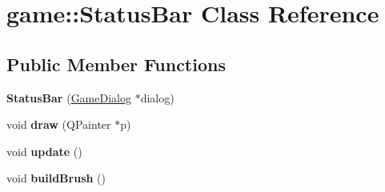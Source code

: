 \hypertarget{classgame_1_1StatusBar}{}\section{game\+:\+:Status\+Bar Class Reference}
\label{classgame_1_1StatusBar}
\subsection*{Public Member Functions}
\begin{DoxyCompactItemize}
\item 
\mbox{\label{classgame_1_1StatusBar_aa221673b8c844eed90b156966622f7aa}} 
{\bfseries Status\+Bar} (\hyperlink{classgame_1_1GameDialog}{Game\+Dialog} $\ast$dialog)
\item 
\mbox{\label{classgame_1_1StatusBar_a07da42cf14cef3b91fbacb08babeba57}} 
void {\bfseries draw} (Q\+Painter $\ast$p)
\item 
\mbox{\label{classgame_1_1StatusBar_ac10ba09b74a617b029fc85e3e806d9df}} 
void {\bfseries update} ()
\item 
\mbox{\label{classgame_1_1StatusBar_a1e35813d42009779f3c24f7ac7ac6fe6}} 
void {\bfseries build\+Brush} ()
\end{DoxyCompactItemize}
